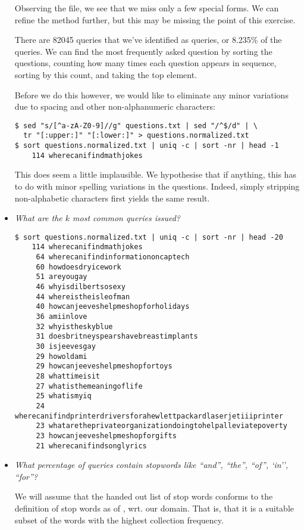 \begin{itemize}
Observing the file, we see that we miss only a few special forms. We can refine
the method further, but this may be missing the point of this exercise.

There are 82045 queries that we've identified as queries, or 8.235\% of the
queries. We can find the most frequently asked question by sorting the
questions, counting how many times each question appears in sequence, sorting
by this count, and taking the top element.

Before we do this however, we would like to eliminate any minor variations due
to spacing and other non-alphanumeric characters:

\begin{lstlisting}
$ sed "s/[^a-zA-Z0-9]//g" questions.txt | sed "/^$/d" | \
  tr "[:upper:]" "[:lower:]" > questions.normalized.txt
$ sort questions.normalized.txt | uniq -c | sort -nr | head -1
    114 wherecanifindmathjokes
\end{lstlisting}

This does seem a little implausible. We hypothesise that if anything, this has
to do with minor spelling variations in the questions. Indeed, simply stripping
non-alphabetic characters first yields the same result.

\item \emph{What are the $k$ most common queries issued?}

\begin{lstlisting}
$ sort questions.normalized.txt | uniq -c | sort -nr | head -20
    114 wherecanifindmathjokes
     64 wherecanifindinformationoncaptech
     60 howdoesdryicework
     51 areyougay
     46 whyisdilbertsosexy
     44 whereistheisleofman
     40 howcanjeeveshelpmeshopforholidays
     36 amiinlove
     32 whyistheskyblue
     31 doesbritneyspearshavebreastimplants
     30 isjeevesgay
     29 howoldami
     29 howcanjeeveshelpmeshopfortoys
     28 whattimeisit
     27 whatisthemeaningoflife
     25 whatismyiq
     24 wherecanifindprinterdriversforahewlettpackardlaserjetiiiprinter
     23 whataretheprivateorganizationdoingtohelpalleviatepoverty
     23 howcanjeeveshelpmeshopforgifts
     21 wherecanifindsonglyrics
\end{lstlisting}

\item \emph{What percentage of queries contain stopwords like ``and'', ``the'',
``of'', `in'', ``for''?}

We will assume that the handed out list of stop words conforms to the
definition of stop words as of \cite[\textsection\ 2.2.2 (p. 27)]{irbook}, wrt.
our domain. That is, that it is a suitable subset of the words with the highest
collection frequency.


\end{itemize}
